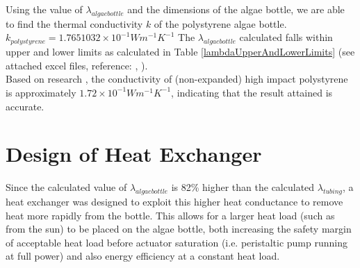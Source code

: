 \documentclass[10pt,a4paper]{IEEEtran}
\begin{document}
	Using the value of $\lambda_{algae bottle}$ and the dimensions of the algae bottle, we are able to find the thermal conductivity $k$ of the polystyrene \cite{polystyreneBottle} algae bottle. $k_{polystyrene} = 1.7651032 \times 10^{-1} W m^{-1} K^{-1}$ The $\lambda_{algae bottle}$ calculated falls within upper and lower limits as calculated in Table \ref{lambdaUpperAndLowerLimits} (see attached excel files, reference: \cite{hValue}, \cite{kValue}).\\

	Based on research \cite{polystyreneConductivity}, the conductivity of (non-expanded) high impact polystyrene is approximately $1.72 \times 10^{-1} W m^{-1} K^{-1}$, indicating that the result attained is accurate.
 	\section{Design of Heat Exchanger}
 	Since the calculated value of $\lambda_{algae bottle}$ is 82\% higher than the calculated $\lambda_{tubing}$, a heat exchanger was designed to exploit this higher heat conductance to remove heat more rapidly from the bottle. This allows for a larger heat load (such as from the sun) to be placed on the algae bottle, both increasing the safety margin of acceptable heat load before actuator saturation (i.e. peristaltic pump running at full power) and also energy efficiency at a constant heat load.\\
 	
\end{document}
